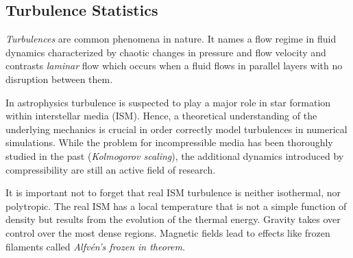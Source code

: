 \subsection{Turbulence Statistics}
\label{sec:turbulence}

\emph{Turbulences} are common phenomena in nature. It names a flow regime in
fluid dynamics characterized by chaotic changes in pressure and flow velocity
and contrasts \emph{laminar} flow which occurs when a fluid flows in parallel
layers with no disruption between them.

In astrophysics turbulence is suspected to play a major role in star formation
within interstellar media (ISM).  Hence, a theoretical understanding of the
underlying mechanics is crucial in order correctly model turbulences in
numerical simulations. While the problem for incompressible media has been
thoroughly studied in the past (\emph{Kolmogorov scaling}), the additional
dynamics introduced by compressibility are still an active field of research.

It is important not to forget that real ISM turbulence is neither isothermal,
nor polytropic. The real ISM has a local temperature that is not a simple
function of density but results from the evolution of the thermal energy.
Gravity takes over control over the most dense regions. Magnetic fields lead to
effects like frozen filaments called \emph{Alfvén's frozen in theorem}.

% 

